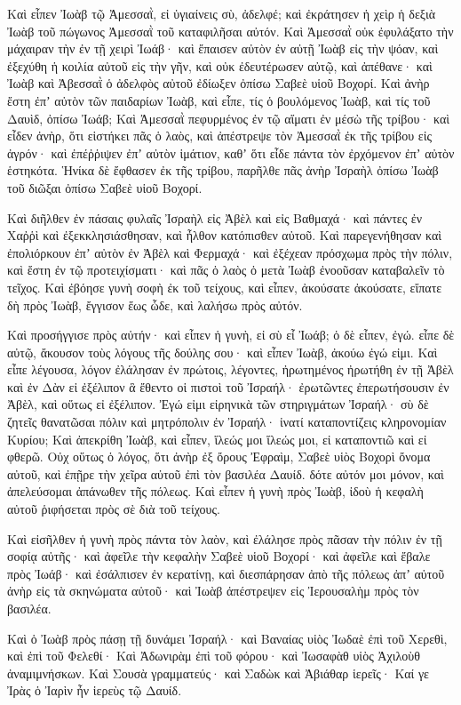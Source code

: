 {\par }{\PP {}Καὶ εἶπεν Ἰωὰβ τῷ Ἀμεσσαῒ, εἰ ὑγιαίνεις σὺ, ἀδελφέ; καὶ ἐκράτησεν ἡ χεὶρ ἡ δεξιὰ Ἰωὰβ τοῦ πώγωνος Ἀμεσσαῒ τοῦ καταφιλῆσαι αὐτόν.
Καὶ Ἀμεσσαῒ οὐκ ἐφυλάξατο τὴν μάχαιραν τὴν ἐν τῇ χειρὶ Ἰωάβ· καὶ ἔπαισεν αὐτὸν ἐν αὐτῇ Ἰωὰβ εἰς τὴν ψόαν, καὶ ἐξεχύθη ἡ κοιλία αὐτοῦ εἰς τὴν γῆν, καὶ οὐκ ἐδευτέρωσεν αὐτῷ, καὶ ἀπέθανε· καὶ Ἰωὰβ καὶ Ἀβεσσαῒ ὁ ἀδελφὸς αὐτοῦ ἐδίωξεν ὀπίσω Σαβεὲ υἱοῦ Βοχορί.
Καὶ ἀνὴρ ἔστη ἐπʼ αὐτὸν τῶν παιδαρίων Ἰωὰβ, καὶ εἶπε, τίς ὁ βουλόμενος Ἰωὰβ, καὶ τίς τοῦ Δαυὶδ, ὀπίσω Ἰωάβ;
Καὶ Ἀμεσσαῒ πεφυρμένος ἐν τῷ αἵματι ἐν μέσὼ τῆς τρίβου· καὶ εἶδεν ἀνὴρ, ὅτι εἱστήκει πᾶς ὁ λαὸς, καὶ ἀπέστρεψε τὸν Ἀμεσσαῒ ἐκ τῆς τρίβου εἰς ἀγρόν· καὶ ἐπέῤῥιψεν ἐπʼ αὐτὸν ἱμάτιον, καθʼ ὅτι εἶδε πάντα τὸν ἐρχόμενον ἐπʼ αὐτὸν ἑστηκότα.
Ἡνίκα δὲ ἔφθασεν ἐκ τῆς τρίβου, παρῆλθε πᾶς ἀνὴρ Ἰσραὴλ ὀπίσω Ἰωὰβ τοῦ διῶξαι ὀπίσω Σαβεὲ υἱοῦ Βοχορί.
\par }{\PP {}Καὶ διῆλθεν ἐν πάσαις φυλαῖς Ἰσραὴλ εἰς Ἀβὲλ καὶ εἰς Βαθμαχά· καὶ πάντες ἐν Χαῤῥὶ καὶ ἐξεκκλησιάσθησαν, καὶ ἦλθον κατόπισθεν αὐτοῦ.
Καὶ παρεγενήθησαν καὶ ἐπολιόρκουν ἐπʼ αὐτὸν ἐν Ἀβὲλ καὶ Φερμαχά· καὶ ἐξέχεαν πρόσχωμα πρὸς τὴν πόλιν, καὶ ἔστη ἐν τῷ προτειχίσματι· καὶ πᾶς ὁ λαὸς ὁ μετὰ Ἰωὰβ ἐνοοῦσαν καταβαλεῖν τὸ τεῖχος.
Καὶ ἐβόησε γυνὴ σοφὴ ἐκ τοῦ τείχους, καὶ εἶπεν, ἀκούσατε ἀκούσατε, εἴπατε δὴ πρὸς Ἰωὰβ, ἔγγισον ἕως ὧδε, καὶ λαλήσω πρὸς αὐτόν.
\par }{\PP {}Καὶ προσήγγισε πρὸς αὐτήν· καὶ εἶπεν ἡ γυνὴ, εἰ σὺ εἶ Ἰωάβ; ὁ δὲ εἶπεν, ἐγώ. εἶπε δὲ αὐτῷ, ἄκουσον τοὺς λόγους τῆς δούλης σου· καὶ εἶπεν Ἰωὰβ, ἀκούω ἐγώ εἰμι.
Καὶ εἶπε λέγουσα, λόγον ἐλάλησαν ἐν πρώτοις, λέγοντες, ἠρωτημένος ἠρωτήθη ἐν τῇ Ἀβὲλ καὶ ἐν Δὰν εἰ ἐξέλιπον ἃ ἔθεντο οἱ πιστοὶ τοῦ Ἰσραήλ· ἐρωτῶντες ἐπερωτήσουσιν ἐν Ἀβὲλ, καὶ οὕτως εἰ ἐξέλιπον.
Ἐγώ εἰμι εἰρηνικὰ τῶν στηριγμάτων Ἰσραήλ· σὺ δὲ ζητεῖς θανατῶσαι πόλιν καὶ μητρόπολιν ἐν Ἰσραήλ· ἱνατί καταποντίζεις κληρονομίαν Κυρίου;
Καὶ ἀπεκρίθη Ἰωὰβ, καὶ εἶπεν, ἵλεώς μοι ἵλεώς μοι, εἰ καταποντιῶ καὶ εἰ φθερῶ.
Οὐχ οὕτως ὁ λόγος, ὅτι ἀνὴρ ἐξ ὄρους Ἐφραὶμ, Σαβεὲ υἱὸς Βοχορὶ ὄνομα αὐτοῦ, καὶ ἐπῇρε τὴν χεῖρα αὐτοῦ ἐπὶ τὸν βασιλέα Δαυίδ. δότε αὐτόν μοι μόνον, καὶ ἀπελεύσομαι ἀπάνωθεν τῆς πόλεως. Καὶ εἶπεν ἡ γυνὴ πρὸς Ἰωὰβ, ἰδοὺ ἡ κεφαλὴ αὐτοῦ ῥιφήσεται πρὸς σὲ διὰ τοῦ τείχους.
\par }{\PP {}Καὶ εἰσῆλθεν ἡ γυνὴ πρὸς πάντα τὸν λαὸν, καὶ ἐλάλησε πρὸς πᾶσαν τὴν πόλιν ἐν τῇ σοφίᾳ αὐτῆς· καὶ ἀφεῖλε τὴν κεφαλὴν Σαβεὲ υἱοῦ Βοχορί· καὶ ἀφεῖλε καὶ ἔβαλε πρὸς Ἰωάβ· καὶ ἐσάλπισεν ἐν κερατίνῃ, καὶ διεσπάρησαν ἀπὸ τῆς πόλεως ἀπʼ αὐτοῦ ἀνὴρ εἰς τὰ σκηνώματα αὐτοῦ· καὶ Ἰωὰβ ἀπέστρεψεν εἰς Ἰερουσαλὴμ πρὸς τὸν βασιλέα.
\par }{\PP {}Καὶ ὁ Ἰωὰβ πρὸς πάσῃ τῇ δυνάμει Ἰσραήλ· καὶ Βαναίας υἱὸς Ἰωδαὲ ἐπὶ τοῦ Χερεθὶ, καὶ ἐπὶ τοῦ Φελεθί·
Καὶ Ἀδωνιρὰμ ἐπὶ τοῦ φόρου· καὶ Ἰωσαφὰθ υἱὸς Ἀχιλοὺθ ἀναμιμνήσκων.
Καὶ Σουσὰ γραμματεύς· καὶ Σαδὼκ καὶ Ἀβιάθαρ ἱερεῖς·
Καί γε Ἰρὰς ὁ Ἰαρὶν ἦν ἱερεὺς τῷ Δαυίδ.

}

